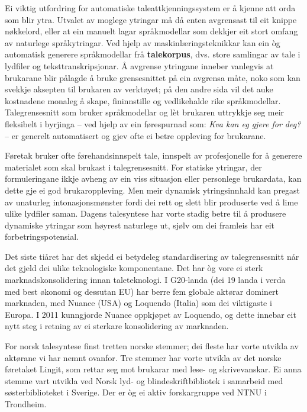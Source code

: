 \begin{multicols}{2}
Ei viktig utfordring for automatiske taleattkjenningssystem er å kjenne att orda som blir ytra. Utvalet av moglege ytringar må då enten avgrensast til eit knippe nøkkelord, eller at ein manuelt lagar språkmodellar som dekkjer eit stort omfang av naturlege språkytringar. Ved hjelp av maskinlæringsteknikkar kan ein òg automatisk generere språkmodellar frå \textbf{talekorpus}, dvs. store samlingar av tale i lydfiler og teksttranskripsjonar. Å avgrense ytringane inneber vanlegvis at brukarane blir pålagde å bruke grensesnittet på ein avgrensa måte, noko som kan svekkje aksepten til brukaren av verktøyet; på den andre sida vil det auke kostnadene monaleg å skape, fininnstille og vedlikehalde rike språkmodellar. Talegrensesnitt som bruker språkmodellar og lèt brukaren uttrykkje seg meir fleksibelt i byrjinga – ved hjelp av ein førespurnad som: \textit{Kva kan eg gjere for deg?} – er generelt automatisert og gjev ofte ei betre oppleving for brukarane.


Føretak bruker ofte førehandsinnspelt tale, innspelt av profesjonelle for å generere materialet som skal brukast i talegrensesnitt. For statiske ytringar, der formuleringane ikkje avheng av ein viss situasjon eller personlege brukardata, kan dette gje ei god brukaroppleving. Men meir dynamisk ytringsinnhald kan pregast av unaturleg intonasjonsmønster fordi dei rett og slett blir produserte ved å lime ulike lydfiler saman. Dagens talesyntese har vorte stadig betre til å produsere dynamiske ytringar som høyrest naturlege ut, sjølv om dei framleis har eit forbetringspotensial. 

Det siste tiåret har det skjedd ei betydeleg standardisering av talegrensesnitt når det gjeld dei ulike teknologiske komponentane. Det har òg vore ei sterk marknadskonsolidering innan taleteknologi. I G20-landa (dei 19 landa i verda med best økonomi og dessutan EU) har berre fem globale aktørar dominert marknaden, med Nuance (USA) og Loquendo (Italia) som dei viktigaste i Europa. I 2011 kunngjorde Nuance oppkjøpet av Loquendo, og dette innebar eit nytt steg i retning av ei sterkare konsolidering av marknaden. 

For norsk talesyntese finst tretten norske stemmer; dei fleste har vorte utvikla av aktørane vi har nemnt ovanfor. 
Tre stemmer har vorte utvikla av det norske føretaket Lingit, som rettar seg mot brukarar med lese- og skrivevanskar. 
Ei anna stemme vart utvikla ved Norsk lyd- og blindeskriftbibliotek i samarbeid med søsterbiblioteket i Sverige. 
Der er òg ei aktiv forskargruppe ved NTNU i Trondheim. 


\end{multicols}
